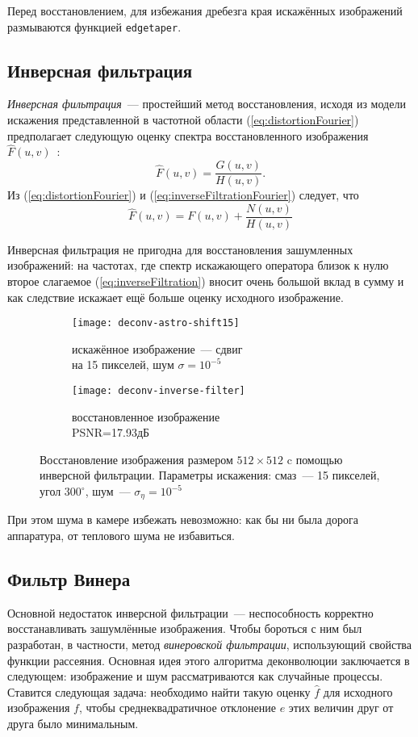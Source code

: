 Перед восстановлением, для избежания дребезга края искажённых изображений размываются функцией \verb|edgetaper|.

\subsection{Инверсная фильтрация}
\textit{Инверсная фильтрация}~--- простейший метод восстановления, исходя из модели искажения представленной в частотной области (\ref{eq:distortionFourier}) предполагает следующую оценку спектра восстановленного изображения $\hat{F}(u,v)$~\cite[стр.~411]{gonsalesDigital2012}:
\begin{equation}\label{eq:inverseFiltrationFourier}
\hat{F}(u,v) = \frac{G(u,v)}{H(u,v)}.
\end{equation}
Из (\ref{eq:distortionFourier}) и (\ref{eq:inverseFiltrationFourier}) следует, что
\begin{equation}\label{eq:inverseFiltration}
\hat{F}(u,v) = F(u,v) + \frac{N(u,v)}{H(u,v)}
\end{equation}

Инверсная фильтрация не пригодна для восстановления зашумленных изображений: на частотах, где спектр искажающего оператора близок к нулю второе слагаемое (\ref{eq:inverseFiltration}) вносит очень большой вклад в сумму и как следствие искажает ещё больше оценку исходного изображение.
\begin{figure}[h!]
	\begin{subfigure}[b]{0.5\textwidth}
		\texttt{[image: deconv-astro-shift15]}
		\caption{искажённое изображение~--- сдвиг \\на 15 пикселей, шум $\sigma=10^{-5}$}
		\label{fig:astroShift15}
	\end{subfigure}%
	\begin{subfigure}[b]{0.5\textwidth}
		\texttt{[image: deconv-inverse-filter]}
		\caption{восстановленное изображение\\ PSNR=17.93дБ}
		\label{fig:astroInverseRestored}
	\end{subfigure}%
	\caption{Восстановление изображения размером $512\times 512$ c помощью инверсной фильтрации. Параметры искажения: смаз~--- 15 пикселей, угол $300^\circ$, шум~--- $\sigma_\eta=10^{-5}$}
\end{figure}

При этом шума в камере избежать невозможно: как бы ни была дорога аппаратура, от теплового шума не избавиться.

\subsection{Фильтр Винера}
Основной недостаток инверсной фильтрации~--- неспособность корректно восстанавливать зашумлённые изображения. Чтобы бороться с ним был разработан, в частности, метод \textit{винеровской фильтрации}, использующий свойства функции рассеяния. Основная идея этого алгоритма деконволюции заключается в следующем: изображение и шум рассматриваются как случайные процессы. Ставится следующая задача: необходимо найти такую оценку $\hat{f}$ для исходного изображения $f$, чтобы среднеквадратичное отклонение $e$ этих величин друг от друга было минимальным.

